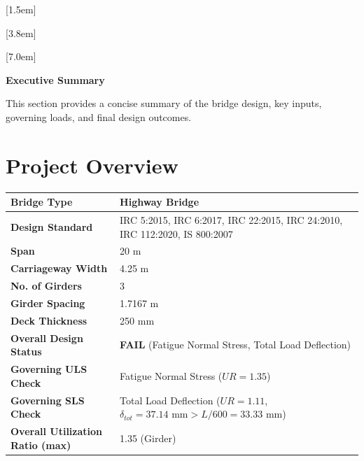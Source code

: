 \documentclass[12pt,a4paper]{report}
\numberwithin{table}{chapter}
\numberwithin{figure}{chapter}
\newcommand{\failBadge}{\colorbox{failBg}{\textcolor{failRed}{\textbf{FAIL}}}}
\begin{document}
[1.5em]
  {\normalfont\vspace{2pt}}
  {\contentslabel{1.5em}}
  {\hspace*{-1.5em}}
  {\hfill\contentspage}

[3.8em]
  {\normalfont}
  {\contentslabel{2.3em}}
  {\hspace*{-2.3em}}
  {\hfill\contentspage}

[7.0em]
  {\normalfont}
  {\contentslabel{3.2em}}
  {\hspace*{-3.2em}}
  {\hfill\contentspage}

\newpage
\renewcommand{\contentsname}{\centering\Large\bfseries Table of Contents}
\tableofcontents


\newpage
{\centering\Large\bfseries Executive Summary\par}
\vspace{0.8em}

This section provides a concise summary of the bridge design, key inputs, governing loads, and final design outcomes.

\section*{Project Overview}
\label{sec:project-overview}


\begin{tabular}{|L{5.5cm}|L{8.5cm}|}
\hline
\textbf{Bridge Type} & Highway Bridge \\
\hline
\textbf{Design Standard} & IRC 5:2015, IRC 6:2017, IRC 22:2015, IRC 24:2010, IRC 112:2020, IS 800:2007 \\
\hline
\textbf{Span} & 20 m \\
\hline
\textbf{Carriageway Width} & 4.25 m \\
\hline
\textbf{No. of Girders} & 3 \\
\hline
\textbf{Girder Spacing} & 1.7167 m \\
\hline
\textbf{Deck Thickness} & 250 mm \\
\hline
\textbf{Overall Design Status} & \failBadge{} (Fatigue Normal Stress, Total Load Deflection) \\
\hline
\textbf{Governing ULS Check} & Fatigue Normal Stress ($UR = 1.35$) \\
\hline
\textbf{Governing SLS Check} & Total Load Deflection ($UR = 1.11$, $\delta_{tot} = 37.14\text{ mm} > L/600 = 33.33\text{ mm}$) \\
\hline
\textbf{Overall Utilization Ratio (max)} & 1.35 (Girder) \\
\hline
\end{tabular}
\end{document}
